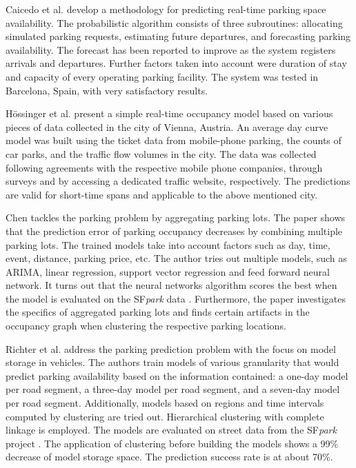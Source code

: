 Caicedo et al. \cite{caicedo} develop a methodology for predicting real-time parking space availability. The probabilistic algorithm consists of three subroutines: allocating simulated parking requests, estimating future departures, and forecasting parking availability. The forecast has been reported to improve as the system registers arrivals and departures. Further factors taken into account were duration of stay and capacity of every operating parking facility. The system was tested in Barcelona, Spain, with very satisfactory results.

H\"ossinger et al. \cite{hoessinger} present a simple real-time occupancy model based on various pieces of data collected in the city of Vienna, Austria. An average day curve model was built using the ticket data from mobile-phone parking, the counts of car parks, and the traffic flow volumes in the city.  The data was collected following agreements with the respective mobile phone companies, through surveys and by accessing a dedicated traffic website, respectively. The predictions are valid for short-time spans and applicable to the above mentioned city.

Chen \cite{xchen} tackles the parking problem by aggregating parking lots. The paper shows that the prediction  error of parking occupancy decreases by combining multiple parking lots. The trained models take into account factors such as day, time, event, distance, parking price, etc. The author tries out multiple models, such as ARIMA, linear regression, support vector regression and feed forward neural network. It turns out that the neural networks algorithm scores the best when the model is evaluated on the SF\textit{park} data \cite{sfpark_open_data}. Furthermore, the paper investigates the specifics of aggregated parking lots 
and finds certain artifacts in the occupancy graph when clustering the respective parking locations.


Richter et al. \cite{richter} address the parking prediction problem with the focus on model storage in vehicles. The authors train models of various granularity that would predict parking availability based on the information contained: a one-day model per road segment, a three-day model per road segment, and a seven-day model per road segment. Additionally, models based on regions and time intervals computed by clustering are tried out. Hierarchical clustering with complete linkage is employed. The models are evaluated on street data from the SF\textit{park} project \cite{sfpark_open_data}. The application of clustering before building the models shows a 99\% decrease of model storage space. The prediction success rate is at about 70\%.


